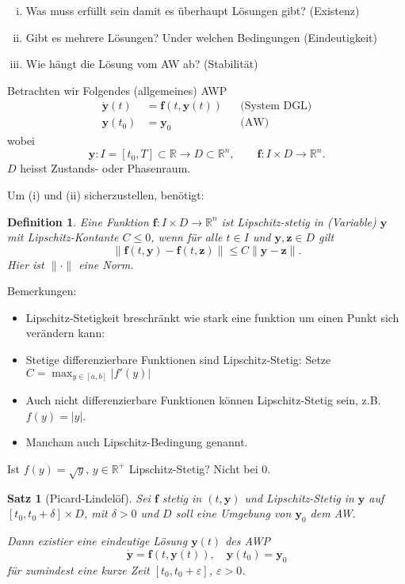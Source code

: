 \documentclass[a4paper]{article}
\newtheorem{defn}{Definition}
\newtheorem{thm}{Satz}
\renewcommand{\vec}[1]{\mathbf{\bm{#1}}}
\begin{document}
\begin{enumerate}[(i)]
  \item Was muss erfüllt sein damit es überhaupt Lösungen gibt? (Existenz)
  \item Gibt es mehrere Lösungen? Under welchen Bedingungen (Eindeutigkeit)
  \item Wie hängt die Lösung vom AW ab? (Stabilität)
\end{enumerate}

Betrachten wir Folgendes (allgemeines) AWP
\begin{align*}
  \dot{\vec{y}}(t) &= \vec{f}(t, \vec{y}(t)) & &\text{(System DGL)} \\
  \vec{y}(t_0) &= \vec{y}_0  & &\text{(AW)}
\end{align*}
wobei
\[
  \vec{y} : I = [t_0, T] \subset \mathbb{R} \to D \subset \mathbb{R}^n,
  \qquad
  \vec{f}: I \times D \to \mathbb{R}^n.
\]
$D$ heisst Zustands- oder Phasenraum.

Um (i) und (ii) sicherzustellen, benötigt:

\begin{defn}
  Eine Funktion $\vec{f}: I \times D \to \mathbb{R}^n$ ist Lipschitz-stetig in
  (Variable) $\vec{y}$ mit Lipschitz-Kontante $C \leq 0$, wenn für alle $t \in
  I$ und $\vec{y}, \vec{z} \in D$ gilt
  \[
    \|\vec{f}(t, \vec{y}) - \vec{f}(t, \vec{z})\|
    \leq C \|\vec{y} - \vec{z}\|.
  \]
  Hier ist $\| \cdot \|$ eine Norm.
\end{defn}

Bemerkungen:
\begin{itemize}
  \item Lipschitz-Stetigkeit breschränkt wie stark eine funktion um einen
    Punkt sich verändern kann:
    \begin{center}
      \skelfig
    \end{center}
  \item Stetige differenzierbare Funktionen sind Lipschitz-Stetig: Setze $C =
    \max_{y \in [a,b]} | f'(y) |$
  \item Auch nicht differenzierbare Funktionen können Lipschitz-Stetig sein,
    z.B. $f(y) = |y|$.
  \item Mancham auch Lipschitz-Bedingung genannt.
\end{itemize}

Ist $f(y) = \sqrt{y}$, $y \in \mathbb{R}^+$ Lipschitz-Stetig? Nicht bei 0.

\begin{thm}[Picard-Lindelöf]
  Sei $\vec{f}$ stetig in $(t, \vec{y})$ und Lipschitz-Stetig in $\vec{y}$ auf
  $[t_0, t_0 + \delta] \times D$, mit $\delta > 0$ und $D$ soll eine Umgebung
  von $\vec{y}_0$ dem AW.

  Dann existier eine eindeutige Lösung $\vec{y}(t)$ des AWP
  \[
    \dot{\vec{y}} = \vec{f}(t, \vec{y}(t)), \quad
    \vec{y}(t_0) = \vec{y}_0
  \]
  für zumindest eine kurze Zeit $[t_0, t_0 + \varepsilon]$, $\varepsilon > 0$.
\end{thm}
\end{document}
